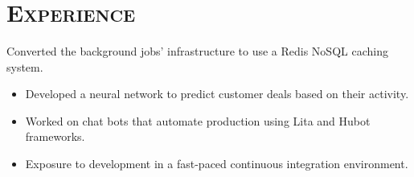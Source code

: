 \begin{resume}
  \begin{formatb}
    \\
    \\
    \body\\
  \end{formatb}

  \section{\textsc{Experience}}
  \begin{position}
    Converted the background jobs' infrastructure to use a Redis NoSQL caching system.
    \begin{itemize}
      \setlength\itemsep{0em}
      \item Developed a neural network to predict customer deals based on their activity.
      \item Worked on chat bots that automate production using Lita and Hubot frameworks.
      \item Exposure to development in a fast-paced continuous integration environment.
    \end{itemize}
  \end{position}


  \begin{formatb}
    \\
    \body\\
  \end{formatb}


\end{resume}
